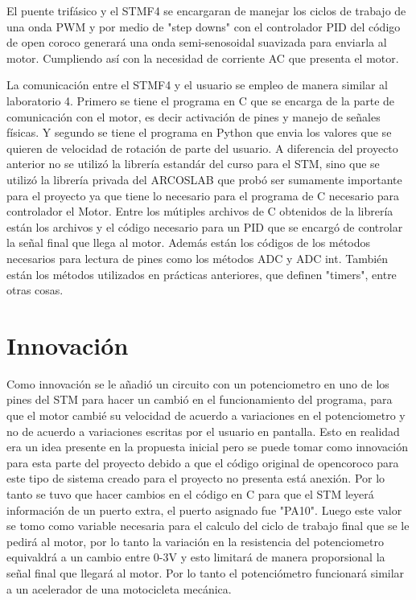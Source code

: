 \documentclass[letterpaper]{article}
\begin{document}
El puente trifásico y el STMF4 se encargaran de manejar los ciclos de trabajo de una onda PWM y por medio de "step downs" con el controlador PID del código de open coroco generará una onda semi-senosoidal suavizada para enviarla al motor. 
Cumpliendo así con la necesidad de corriente AC que presenta el motor.
 
La comunicación entre el STMF4 y el usuario se empleo de manera similar al laboratorio 4. Primero se tiene el programa en C que se encarga de la parte de comunicación
con el motor, es decir activación de pines y manejo de señales físicas. Y segundo se tiene el programa en Python que envia los valores que se quieren de velocidad de rotación de parte del usuario.
A diferencia del proyecto anterior no se utilizó la librería estandár del curso para el STM, sino que se utilizó la librería privada del ARCOSLAB que probó ser sumamente importante para el proyecto ya
que tiene lo necesario para el programa de C necesario para controlador el Motor. 
Entre los mútiples archivos de C obtenidos de la librería están los archivos y el código necesario para un PID que se encargó
de controlar la señal final que llega al motor. Además están los códigos de los métodos necesarios para lectura de pines como los métodos ADC y ADC int. También están los métodos utilizados en prácticas
anteriores, que definen "timers", entre otras cosas.

 
 

\section{Innovación}
Como innovación se le añadió un circuito con un potenciometro en uno de los pines del STM para hacer un cambió en el funcionamiento del programa, para que el motor cambié su velocidad 
de acuerdo a variaciones en el potenciometro y no de acuerdo a variaciones escritas por el usuario en pantalla. Esto en realidad era un idea presente en la propuesta inicial pero se puede tomar como innovación
para esta parte del proyecto debido a que el código original de opencoroco para este tipo de sistema creado para el proyecto no presenta está anexión. Por lo tanto se tuvo que hacer cambios en el código en C
para que el STM leyerá información de un puerto extra, el puerto asignado fue "PA10". Luego este valor se tomo como variable necesaria para el calculo del ciclo de trabajo final que se le pedirá al motor, por lo tanto
la variación en la resistencia del potenciometro equivaldrá a un cambio entre 0-3V y esto limitará de manera proporsional la señal final que llegará al motor. Por lo tanto el potenciómetro funcionará 
similar a un acelerador de una motocicleta mecánica.
\end{document}
